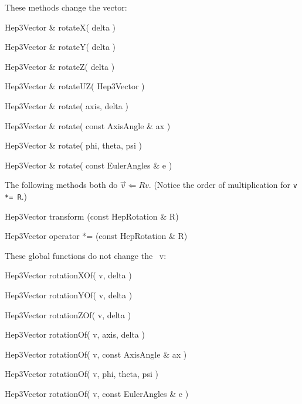 \noindent
These methods change the vector:

\begin{shortlist}
  \item Hep3Vector \& rotateX( delta ) \see{\ref{eq:rotX}}
  \item Hep3Vector \& rotateY( delta ) \see{\ref{eq:rotY}}
  \item Hep3Vector \& rotateZ( delta ) \see{\ref{eq:rotZ}, \ref{eq:rotZ:2}}
  \item Hep3Vector \& rotateUZ( Hep3Vector ) \see{\ref{eq:rotUz}}
\end{shortlist}

\begin{shortlist}
  \item Hep3Vector \& rotate( axis, delta ) \see{\ref{eq:axisrot}}
  \item Hep3Vector \& rotate( const AxisAngle \& ax ) \see{\ref{eq:axisrot}}
  \item Hep3Vector \& rotate( phi, theta, psi ) \see{\ref{eq:eulerrot}}
  \item Hep3Vector \& rotate( const EulerAngles \& e ) \see{\ref{eq:eulerrot}}
\end{shortlist}

\noindent 
The following methods both do $\vec{v} \Longleftarrow R v$.  
(Notice the order of multiplication for {\tt v *= R}.)

\begin{shortlist}
  \item Hep3Vector transform   (const HepRotation \& R) \see{\ref{eq:opstareq}}
  \item Hep3Vector operator *= (const HepRotation \& R) \see{\ref{eq:opstareq}}
\end{shortlist}


\noindent
These global functions do not change the \SV\ v:

\begin{shortlist}
  \item Hep3Vector rotationXOf( v, delta ) \see{\ref{eq:rotX}}
  \item Hep3Vector rotationYOf( v, delta ) \see{\ref{eq:rotY}}
  \item Hep3Vector rotationZOf( v, delta ) \see{\ref{eq:rotZ}, \ref{eq:rotZ:2}}
\end{shortlist}

\begin{shortlist}
  \item Hep3Vector rotationOf( v, axis, delta ) \see{\ref{eq:axisrot}}
  \item Hep3Vector rotationOf( v, const AxisAngle \& ax ) \see{\ref{eq:axisrot}}
  \item Hep3Vector rotationOf( v, phi, theta, psi ) \see{\ref{eq:eulerrot}}
  \item Hep3Vector rotationOf( v, const EulerAngles \& e ) \see{\ref{eq:eulerrot}}
\end{shortlist}


